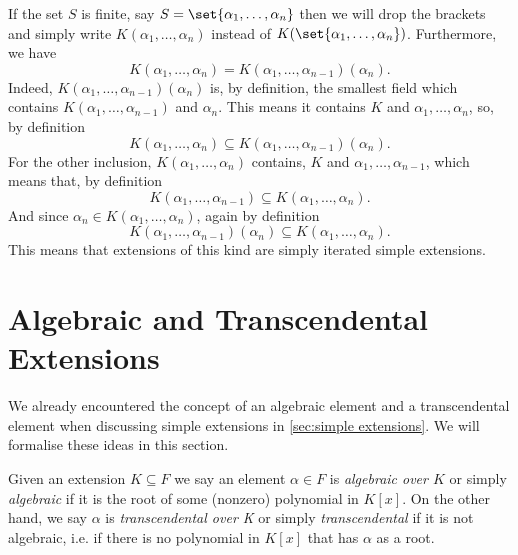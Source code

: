 \documentclass[12pt,oneside]{book}
\begin{document}
If the set \( S \) is finite, say \( S = \set{\alpha_1, \dots, \alpha_n} \) then we will
drop the brackets and simply write \( K(\alpha_1, \dots, \alpha_n) \) instead of \(
K(\set{\alpha_1, \dots, \alpha_n}) \). Furthermore, we have
\begin{equation*}
	K(\alpha_1, \dots, \alpha_n) = K(\alpha_1, \dots, \alpha_{n-1})(\alpha_n).
\end{equation*}
Indeed, \( K(\alpha_1, \dots, \alpha_{n-1})(\alpha_n) \) is, by definition, the smallest
field which contains \( K(\alpha_1, \dots, \alpha_{n-1}) \) and \( \alpha_n \). This
means it contains \( K \) and \( \alpha_1, \dots, \alpha_n \), so, by definition
\begin{equation*}
	K(\alpha_1, \dots, \alpha_n) \subseteq K(\alpha_1, \dots, \alpha_{n-1})(\alpha_n).
\end{equation*}
For the other inclusion, \( K(\alpha_1, \dots, \alpha_n) \) contains, \( K
\) and \( \alpha_1, \dots, \alpha_{n-1} \), which means that, by definition
\begin{equation*}
	K(\alpha_1, \dots, \alpha_{n-1}) \subseteq K(\alpha_1, \dots, \alpha_n).
\end{equation*}
And since \( \alpha_n \in K(\alpha_1, \dots, \alpha_n) \), again by definition
\begin{equation*}
	K(\alpha_1, \dots, \alpha_{n-1})(\alpha_n) \subseteq K(\alpha_1, \dots, \alpha_n).
\end{equation*}
This means that extensions of this kind are simply iterated simple extensions.

\section{Algebraic and Transcendental Extensions}
We already encountered the concept of an algebraic element and a transcendental element
when discussing simple extensions in \cref{sec:simple extensions}. We will formalise these
ideas in this section.

\begin{definition} \label{def:algebraic and
	transcendental element}
	Given an extension \( K \subseteq F \) we say an element \( \alpha \in F \) is
	\emph{algebraic over \( K \)} or simply \emph{algebraic} if it is the root of some
	(nonzero)	polynomial in	\( K[x] \). On the other hand, we say \( \alpha \) is
	\emph{transcendental	over K} or simply \emph{transcendental} if it is not algebraic,
	i.e. if there is no	polynomial in	\( K[x] \) that has \( \alpha \) as a root. 
\end{definition}
\end{document}
